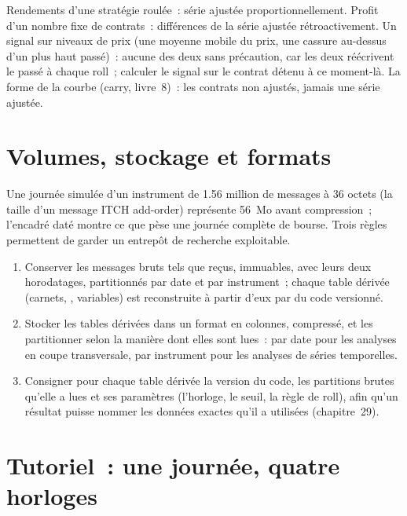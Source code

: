 \begin{remark}\label{rem:rs:market-data-for-research:which}
Rendements d'une stratégie roulée~: série ajustée proportionnellement. Profit d'un nombre fixe de contrats~: différences de la série ajustée rétroactivement. Un signal sur
niveaux de prix (une moyenne mobile du prix, une cassure au-dessus d'un plus haut passé)~: aucune des deux sans précaution, car les deux réécrivent le passé
à chaque roll~; calculer le signal sur le contrat détenu à ce moment-là. La forme de la courbe (carry, livre~8)~: les contrats non ajustés,
jamais une série ajustée.
\end{remark}

\section{Volumes, stockage et formats}

Une journée simulée d'un instrument de 1.56 million de messages à 36 octets (la taille d'un message ITCH add-order) représente 56~Mo avant
compression~; l'encadré daté montre ce que pèse une journée complète de bourse. Trois règles permettent de garder un entrepôt de recherche exploitable.

\begin{method}\label{met:rs:market-data-for-research:store}
\begin{enumerate}
\item Conserver les messages bruts tels que reçus, immuables, avec leurs deux horodatages, partitionnés par date et par instrument~; chaque table
dérivée (carnets, , variables) est reconstruite à partir d'eux par du code versionné.
\item Stocker les tables dérivées dans un format en colonnes, compressé, et les partitionner selon la manière dont elles sont lues~: par date pour
les analyses en coupe transversale, par instrument pour les analyses de séries temporelles.
\item Consigner pour chaque table dérivée la version du code, les partitions brutes qu'elle a lues et ses paramètres (l'horloge, le
seuil, la règle de roll), afin qu'un résultat puisse nommer les données exactes qu'il a utilisées (chapitre~29).
\end{enumerate}
\end{method}

\section{Tutoriel~: une journée, quatre horloges}\label{tut:rs:market-data-for-research:clocks}


